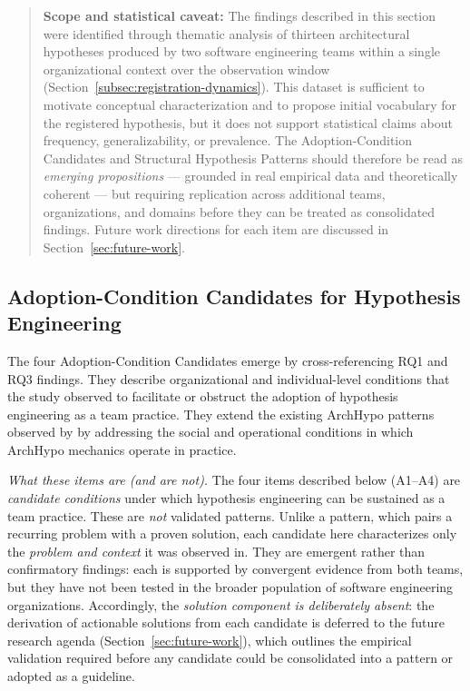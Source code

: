 \begin{quote}
\textbf{Scope and statistical caveat:}
The findings described in this section were identified through thematic analysis
of thirteen architectural hypotheses produced by two software engineering teams
within a single organizational context over the observation window
(Section~\ref{subsec:registration-dynamics}).
This dataset is sufficient to motivate conceptual characterization and to propose
initial vocabulary for the registered hypothesis, but it does not support statistical
claims about frequency, generalizability, or prevalence.
The Adoption-Condition Candidates and Structural Hypothesis Patterns should
therefore be read as
\emph{emerging propositions} --- grounded in real empirical data and theoretically
coherent --- but requiring replication across additional teams, organizations, and
domains before they can be treated as consolidated findings.
Future work directions for each item are discussed in Section~\ref{sec:future-work}.
\end{quote}

\subsection{Adoption-Condition Candidates for Hypothesis Engineering}
\label{sec:group-a-patterns}

The four Adoption-Condition Candidates emerge by cross-referencing RQ1 and RQ3
findings. They describe organizational and individual-level conditions that the
study observed to facilitate or obstruct the adoption of hypothesis engineering
as a team practice. They extend the existing ArchHypo patterns observed by
\citet{silva2024patterns, silva2023initialpatterns} by addressing the social and
operational conditions in which ArchHypo mechanics operate in practice.

\emph{What these items are (and are not).} The four items described below
(A1--A4) are \emph{candidate conditions} under which hypothesis engineering can be sustained as a team practice. These are \emph{not} validated patterns. Unlike a pattern, which pairs a recurring
problem with a proven solution, each candidate here characterizes only the
\emph{problem and context} it was observed in. They are emergent rather than
confirmatory findings: each is supported by convergent evidence from both teams,
but they have not been tested in the broader population of software engineering
organizations. Accordingly, the \emph{solution component is deliberately
absent}: the derivation of actionable solutions from each candidate is deferred
to the future research agenda (Section~\ref{sec:future-work}), which
outlines the empirical validation required before any candidate could be
consolidated into a pattern or adopted as a guideline.

